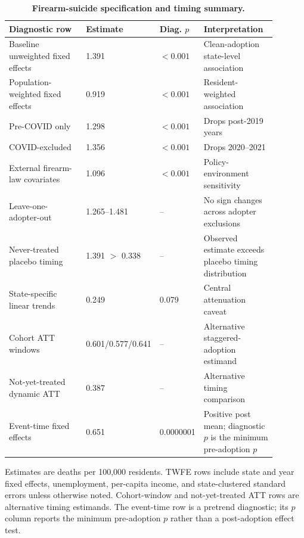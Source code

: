 \begin{table}[H]
\centering
\caption{\textbf{Firearm-suicide specification and timing summary.}}
\label{tab:diagnostic_spine}
\begin{threeparttable}
\small
\begin{tabular}{@{}p{0.33\linewidth}p{0.18\linewidth}p{0.09\linewidth}p{0.29\linewidth}@{}}
\toprule
Diagnostic row & Estimate & Diag. $p$ & Interpretation \\
\midrule
Baseline unweighted fixed effects & 1.391 & $<0.001$ & Clean-adoption state-level association \\
Population-weighted fixed effects & 0.919 & $<0.001$ & Resident-weighted association \\
Pre-COVID only & 1.298 & $<0.001$ & Drops post-2019 years \\
COVID-excluded & 1.356 & $<0.001$ & Drops 2020--2021 \\
External firearm-law covariates & 1.096 & $<0.001$ & Policy-environment sensitivity \\
Leave-one-adopter-out & 1.265--1.481 & -- & No sign changes across adopter exclusions \\
Never-treated placebo timing & 1.391 $>$ 0.338 & -- & Observed estimate exceeds placebo timing distribution \\
State-specific linear trends & 0.249 & 0.079 & Central attenuation caveat \\
Cohort ATT windows & 0.601/0.577/0.641 & -- & Alternative staggered-adoption estimand \\
Not-yet-treated dynamic ATT & 0.387 & -- & Alternative timing comparison \\
Event-time fixed effects & 0.651 & 0.0000001 & Positive post mean; diagnostic $p$ is the minimum pre-adoption $p$ \\
\bottomrule
\end{tabular}
\begin{tablenotes}
\small
\item Estimates are deaths per 100,000 residents. TWFE rows include state and year fixed effects, unemployment, per-capita income, and state-clustered standard errors unless otherwise noted. Cohort-window and not-yet-treated ATT rows are alternative timing estimands. The event-time row is a pretrend diagnostic; its $p$ column reports the minimum pre-adoption $p$ rather than a post-adoption effect test.
\end{tablenotes}
\end{threeparttable}
\end{table}
